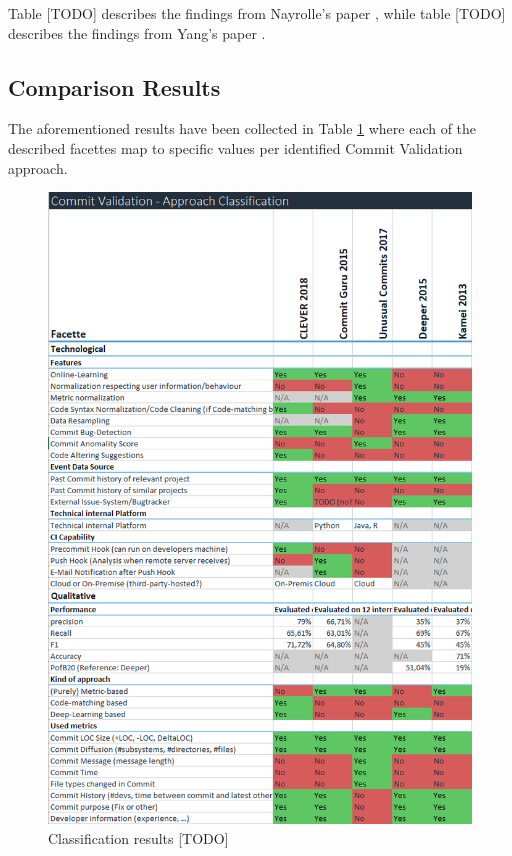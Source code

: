 Table [TODO] describes the findings from Nayrolle's paper \cite{Nayrolles2018}, while table [TODO] describes the findings from Yang's paper \cite{Yang2015}.




\subsection{Comparison Results}

The aforementioned results have been collected in Table \ref{fig:classification} where each of the described facettes map to specific values per identified Commit Validation approach.

\begin{figure}[H]
	\label{fig:classification}
	\centering
	\includegraphics[width=15cm]{images/classification}
	\caption{Classification results [TODO]}
\end{figure}

